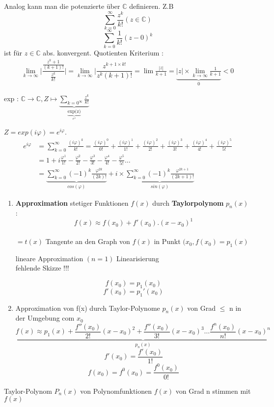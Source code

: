 \begin{remark}
Analog kann man die potenzierte über $\mathbb{C}$ definieren.
Z.B\\
\[ \sum_{k=0}^{\infty}{\frac{z^k}{k!}}(z \in \mathbb{C}) \] 
\[ \sum_{k=0}^{\infty}{\frac{1}{k!}(z-0)^k} \] ist für $ z \in \mathbb{C} $ abs. konvergent.
Quotienten Kriterium : 
\begin{align*}
\lim_{k \to \infty}{\bigg| \dfrac{\frac{z^k+1}{(k+1)!}}{\frac{z^k}{k!}}\bigg|} = \lim_{k \to \infty}{\bigg|\dfrac{z^{k+1 \times k!}}{z^k(k+1)!}} = \lim{\frac{|z|}{k+1}} = \underbrace{|z|\times \lim_{k \to \infty}{\frac{1}{k+1}}}_{0}<0
\end{align*} 

exp : $\mathbb{C} \rightarrow \mathbb{C} , Z \longmapsto  \underbrace{\sum_{k=0^{\infty}}{\frac{z^k}{k!}}}_{\underbrace{\text{exp(z)}}_{e^z}}$

$Z = exp(i \varphi)= e ^{i \varphi}$.
\begin{align*}
e ^{i \varphi} &= \sum_{k=0}^{\infty}{\frac{(i \varphi)^k}{k!}} = \frac{(i \varphi)^0}{0!} + \frac{(i \varphi)^1}{1!} + \frac{(i \varphi)^2}{2!} + \frac{(i \varphi)^3}{3!} + \frac{(i \varphi)^4}{4!} + \frac{(i \varphi)^5}{5!}\\
 &= 1 +  i \frac{\varphi^1}{1!} - \frac{\varphi^2}{2!} - \frac{\varphi^3}{3!} - \frac{\varphi^4}{4!} - \frac{\varphi^5}{5!} \dots \\
 &= \underbrace{\sum_{k=0}^{\infty}{(-1)^k \frac{\varphi^{2k}}{(2k)!}}}_{cos(\varphi)} + i \times \underbrace{\sum_{k=0}^{\infty}{(-1)^k \frac{\varphi^{2k+1}}{(2k+1)!}}}_{sin(\varphi)}
\end{align*}
\end{remark}
\begin{enumerate}
\item \textbf{Approximation} stetiger Funktionen $f(x)$ durch \textbf{Taylorpolynom} $p_n(x)$ :
$$f(x) \approx f(x_0)+f'(x_0).(x-x_0)^1$$\\
$= t(x)$ Tangente an den Graph von $f(x)$ in Punkt $(x_0 , f(x_0) = p_1(x)$
 
lineare Approximation $(n=1)$
Linearisierung\\
fehlende Skizze !!! 

\begin{remark}
\[ f(x_0)= p_1(x_0) \]
\[ f'(x_0)= p_1'(x_0) \]
\end{remark}

\item Approximation von f(x) durch Taylor-Polynome $p_n(x)$ von Grad $\leq$ n in der Umgebung com $x_0$
\[ \underbrace{f(x) \approx p_1(x) + 
\frac{f''(x_0)}{2!}(x-x_0)^2 +
\frac{f''(x_0)}{3!}(x-x_0)^3 \dots
\frac{f^n(x_0)}{n!}(x-x_0)^n}_{p_n(x)}\]
\[f'(x_0) = \frac{f'(x_0)}{1!} \]
\[f(x_0) = f^0(x_0) = \frac{f^0(x_0)}{0!}\]
\end{enumerate}
\begin{remark}
Taylor-Polynom $P_n(x)$ von Polynomfunktionen $f(x)$ von Grad n stimmen mit  $f(x)$ 
\end{remark}

